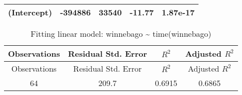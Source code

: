 \documentclass[]{book}
\theoremstyle{definition}
\theoremstyle{definition}
\theoremstyle{remark}
\begin{document}
\begin{longtable}[c]{@{}ccccc@{}}
\begin{minipage}[t]{0.26\columnwidth}
\textbf{(Intercept)}
\strut\end{minipage} &
\begin{minipage}[t]{0.13\columnwidth}\centering\strut
-394886
\strut\end{minipage} &
\begin{minipage}[t]{0.16\columnwidth}\centering\strut
33540
\strut\end{minipage} &
\begin{minipage}[t]{0.12\columnwidth}\centering\strut
-11.77
\strut\end{minipage} &
\begin{minipage}[t]{0.12\columnwidth}\centering\strut
1.87e-17
\strut\end{minipage}\tabularnewline
\bottomrule
\end{longtable}

\begin{longtable}[c]{@{}cccc@{}}
\caption{Fitting linear model: winnebago \textasciitilde{}
time(winnebago)}\tabularnewline
\toprule
\begin{minipage}[b]{0.18\columnwidth}\centering\strut
Observations
\strut\end{minipage} &
\begin{minipage}[b]{0.27\columnwidth}\centering\strut
Residual Std. Error
\strut\end{minipage} &
\begin{minipage}[b]{0.10\columnwidth}\centering\strut
\(R^2\)
\strut\end{minipage} &
\begin{minipage}[b]{0.20\columnwidth}\centering\strut
Adjusted \(R^2\)
\strut\end{minipage}\tabularnewline
\midrule
\endfirsthead
\toprule
\begin{minipage}[b]{0.18\columnwidth}\centering\strut
Observations
\strut\end{minipage} &
\begin{minipage}[b]{0.27\columnwidth}\centering\strut
Residual Std. Error
\strut\end{minipage} &
\begin{minipage}[b]{0.10\columnwidth}\centering\strut
\(R^2\)
\strut\end{minipage} &
\begin{minipage}[b]{0.20\columnwidth}\centering\strut
Adjusted \(R^2\)
\strut\end{minipage}\tabularnewline
\midrule
\endhead
\begin{minipage}[t]{0.18\columnwidth}\centering\strut
64
\strut\end{minipage} &
\begin{minipage}[t]{0.27\columnwidth}\centering\strut
209.7
\strut\end{minipage} &
\begin{minipage}[t]{0.10\columnwidth}\centering\strut
0.6915
\strut\end{minipage} &
\begin{minipage}[t]{0.20\columnwidth}\centering\strut
0.6865
\strut\end{minipage}\tabularnewline
\bottomrule
\end{longtable}
\end{document}
